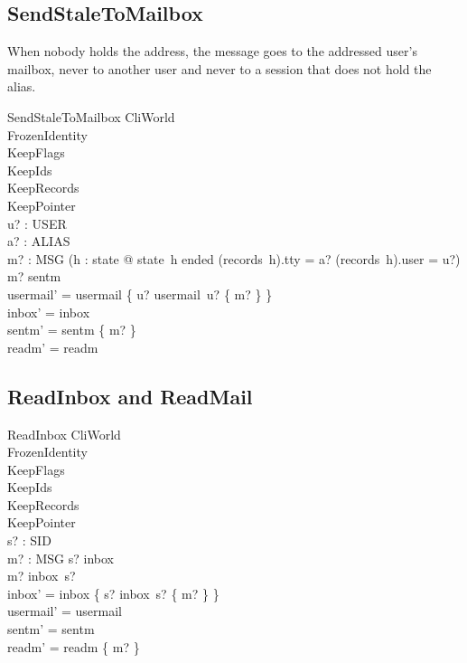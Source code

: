 \documentclass[a4paper,10pt,fleqn]{article}
\begin{document}
\subsection{SendStaleToMailbox}

When nobody holds the address, the message goes to the addressed user's
mailbox, never to another user and never to a session that does not hold
the alias.

\begin{schema}{SendStaleToMailbox}
  \Delta CliWorld \\
  FrozenIdentity \\
  KeepFlags \\
  KeepIds \\
  KeepRecords \\
  KeepPointer \\
  u? : USER \\
  a? : ALIAS \\
  m? : MSG
  \where
  \lnot (\exists h : \dom state @
    state~h \neq ended
      \land (records~h).tty = a?
      \land (records~h).user = u?) \\
  m? \notin sentm \\
  usermail' = usermail \oplus \{ u? \mapsto usermail~u? \cup \{ m? \} \} \\
  inbox' = inbox \\
  sentm' = sentm \cup \{ m? \} \\
  readm' = readm
\end{schema}

\subsection{ReadInbox and ReadMail}

\begin{schema}{ReadInbox}
  \Delta CliWorld \\
  FrozenIdentity \\
  KeepFlags \\
  KeepIds \\
  KeepRecords \\
  KeepPointer \\
  s? : SID \\
  m? : MSG
  \where
  s? \in \dom inbox \\
  m? \in inbox~s? \\
  inbox' = inbox \oplus \{ s? \mapsto inbox~s? \setminus \{ m? \} \} \\
  usermail' = usermail \\
  sentm' = sentm \\
  readm' = readm \cup \{ m? \}
\end{schema}
\end{document}
